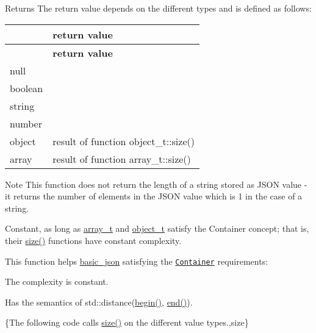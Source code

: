 \begin{DoxyReturn}{Returns}
The return value depends on the different types and is defined as follows\+: \tabulinesep=1mm
\begin{longtabu} spread 0pt [c]{*2{|X[-1]}|}
\hline
{}&{\bf return value  }\\
\endfirsthead
\hline
\endfoot
\hline
{}&{\bf return value  }\\
\endhead
null &{} \\
boolean &{} \\
string &{} \\
number &{} \\
object &result of function object\+\_\+t\+::size() \\
array &result of function array\+\_\+t\+::size() \\
\end{longtabu}

\end{DoxyReturn}
\begin{DoxyNote}{Note}
This function does not return the length of a string stored as J\+S\+ON value -\/ it returns the number of elements in the J\+S\+ON value which is 1 in the case of a string.
\end{DoxyNote}
Constant, as long as \hyperlink{classnlohmann_1_1basic__json_a4c409f1b6d9caf3412c78af9a5883fed}{array\+\_\+t} and \hyperlink{classnlohmann_1_1basic__json_a3cdea044cc3ecba1c4f9874a89daf6e4}{object\+\_\+t} satisfy the Container concept; that is, their \hyperlink{classnlohmann_1_1basic__json_a25e27ad0c6d53c01871c5485e1f75b96}{size()} functions have constant complexity.

This function helps {\ttfamily \hyperlink{classnlohmann_1_1basic__json}{basic\+\_\+json}} satisfying the \href{http://en.cppreference.com/w/cpp/concept/Container}{\tt Container} requirements\+:
\begin{DoxyItemize}
\item The complexity is constant.
\item Has the semantics of {\ttfamily std\+::distance(\hyperlink{classnlohmann_1_1basic__json_a0ff28dac23f2bdecee9564d07f51dcdc}{begin()}, \hyperlink{classnlohmann_1_1basic__json_a13e032a02a7fd8a93fdddc2fcbc4763c}{end()})}.
\end{DoxyItemize}

\{The following code calls {\ttfamily \hyperlink{classnlohmann_1_1basic__json_a25e27ad0c6d53c01871c5485e1f75b96}{size()}} on the different value types.,size\}

